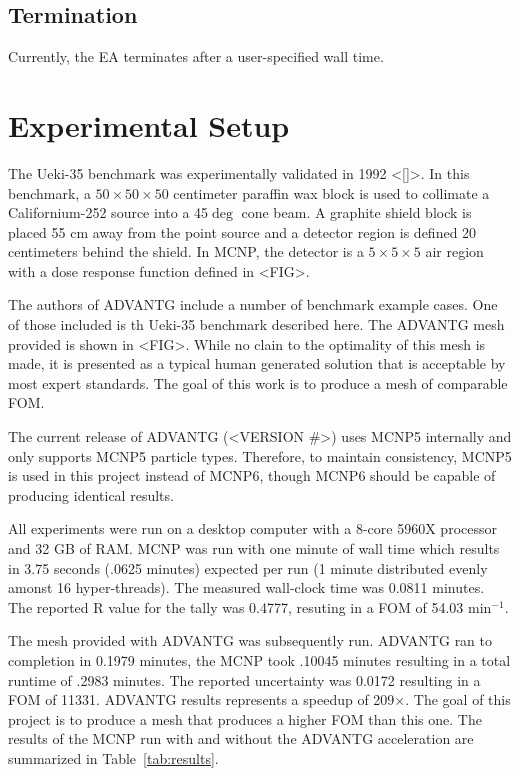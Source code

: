 \documentclass[conference]{IEEEtran}
\begin{document}
\subsection{Termination}
Currently, the EA terminates after a user-specified wall time.

\section{Experimental Setup}
The Ueki-35 benchmark was experimentally validated in 1992 <[]>. In this benchmark, a $50 \times 50 \times 50$ centimeter paraffin wax block is used to collimate a Californium-252 source into a 45$\deg$ cone beam. A graphite shield block is placed 55 cm away from the point source and a detector region is defined 20 centimeters behind the shield. In MCNP, the detector is a $5 \times 5 \times 5$ air region with a dose response function defined in <FIG>. 

The authors of ADVANTG include a number of benchmark example cases. One of those included is th Ueki-35 benchmark described here. The ADVANTG mesh provided is shown in <FIG>. While no clain to the optimality of this mesh is made, it is presented as a typical human generated solution that is acceptable by most expert standards. The goal of this work is to produce a mesh of comparable FOM.

The current release of ADVANTG (<VERSION \#>) uses MCNP5 internally and only supports MCNP5 particle types. Therefore, to maintain consistency, MCNP5 is used in this project instead of MCNP6, though MCNP6 should be capable of producing identical results.

All experiments were run on a desktop computer with a 8-core 5960X processor and 32 GB of RAM. MCNP was run with one minute of wall time which results in 3.75 seconds (.0625 minutes) expected per run (1 minute distributed evenly amonst 16 hyper-threads). The measured wall-clock time was 0.0811 minutes. The reported R value for the tally was 0.4777, resuting in a FOM of 54.03 min$^{-1}$.

The mesh provided with ADVANTG was subsequently run. ADVANTG ran to completion in 0.1979 minutes, the MCNP took .10045 minutes resulting in a total runtime of .2983 minutes. The reported uncertainty was 0.0172 resulting in a FOM of 11331. ADVANTG results represents a speedup of 209$\times$. The goal of this project is to produce a mesh that produces a higher FOM than this one. The results of the MCNP run with and without the ADVANTG acceleration are summarized in Table~\ref{tab:results}.
\end{document}
